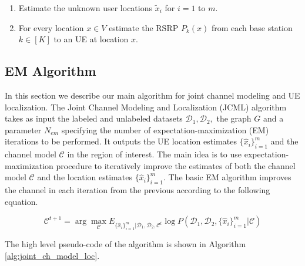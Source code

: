 \documentclass[conference, 10pt]{IEEEtran}
\begin{document}
\begin{enumerate}

\item Estimate the unknown user locations $\tilde{x}_i$ for $i=1$ to $m.$

\item For every location $x \in V$ estimate the RSRP $P_k(x)$ from each base
	station $k \in [K]$ to an UE at location $x.$


\end{enumerate}  




\subsection{EM Algorithm}

In this section we describe our main algorithm for joint channel modeling and UE
localization. The Joint Channel Modeling and Localization (JCML) algorithm takes
as input the labeled and unlabeled datasets $\mathcal{D}_1,\mathcal{D}_2,$ the
graph $G$ and a parameter $N_{em}$ specifying the number of
expectation-maximization (EM) iterations to be performed. It outputs the UE
location estimates $\{\hat{x}_i\}_{i=1}^m$ and the channel model $\mathcal{C}$
in the region of interest. The main idea is to use expectation-maximization
procedure to iteratively improve the estimates of both the channel model
$\mathcal{C}$ and the location estimates $\{\hat{x}_i\}_{i=1}^m.$ The basic EM
algorithm improves the channel in each iteration from the previous according to
the following equation.

\begin{equation}
\mathcal{C}^{t+1} = \arg \max_{\mathcal{C}} E_{\{\hat{x}_i\}_{i=1}^m |\mathcal{D}_1,\mathcal{D}_2,\mathcal{C}^t} \log  P(\mathcal{D}_1,\mathcal{D}_2,\{\hat{x}_i\}_{i=1}^m|\mathcal{C}) \label{eq:EM}
\end{equation}

The high level pseudo-code of the algorithm is shown in Algorithm \ref{alg:joint_ch_model_loc}.  

\end{document}

